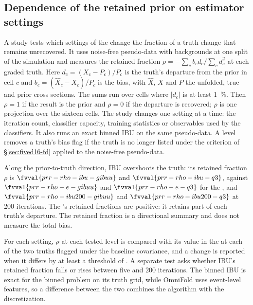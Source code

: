 \subsection{Dependence of the retained prior on estimator settings}
\label{sec:fived16-prr}
A study tests which settings of the \estMultiD{} change the fraction of a truth change that remains unrecovered. It uses noise-free pseudo-data with backgrounds at one split of the simulation and measures the retained fraction $\rho=-\sum_c b_c d_c/\sum_c d_c^2$ at each graded truth. Here $d_c=(X_c-P_c)/P_c$ is the truth's departure from the prior in cell $c$ and $b_c=(\hat X_c-X_c)/P_c$ is the bias, with $\hat X$, $X$ and $P$ the unfolded, true and prior cross sections. The sums run over cells where $|d_c|$ is at least \SI{1}{\percent}. Then $\rho=1$ if the result is the prior and $\rho=0$ if the departure is recovered; $\rho$ is one projection over the sixteen cells. The study changes one setting at a time: the iteration count, classifier capacity, training statistics or observables used by the classifiers. It also runs an exact binned IBU on the same pseudo-data. A level removes a truth's bias flag if the truth is no longer listed under the criterion of \S\ref{sec:fived16-fd} applied to the noise-free pseudo-data.

Along the prior-to-truth direction, IBU overshoots the truth: its retained fraction $\rho$ is $\fvval{prr-rho-ibu-gibuu}$ and $\fvval{prr-rho-ibu-q3}$, against $\fvval{prr-rho-e-gibuu}$ and $\fvval{prr-rho-e-q3}$ for the \estMultiD{}, and $\fvval{prr-rho-ibu200-gibuu}$ and $\fvval{prr-rho-ibu200-q3}$ at 200 iterations. The \estMultiD{}'s retained fractions are positive: it retains part of each truth's departure. The retained fraction is a directional summary and does not measure the total bias.

For each setting, $\rho$ at each tested level is compared with its value in the \estMultiD{} at each of the two truths flagged under the baseline covariance, and a change is reported when it differs by at least a threshold of . A separate test asks whether IBU's retained fraction falls or rises between five and 200 iterations. The binned IBU is exact for the binned problem on its truth grid, while OmniFold uses event-level features, so a difference between the two combines the algorithm with the discretization.

